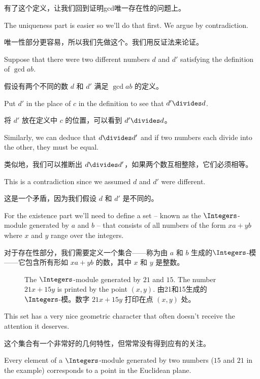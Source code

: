 有了这个定义，让我们回到证明gcd唯一存在性的问题上。

The uniqueness part is easier so we'll
do that first.  We argue by contradiction.

唯一性部分更容易，所以我们先做这个。我们用反证法来论证。

Suppose that there were
two different numbers $d$ and $d'$ satisfying the definition of $\gcd{a}{b}$.

假设有两个不同的数 $d$ 和 $d'$ 满足 $\gcd{a}{b}$ 的定义。

Put $d'$ in the place of $c$ in the definition to see that $d' \divides d$.

将 $d'$ 放在定义中 $c$ 的位置，可以看到 $d' \divides d$。

Similarly, we can deduce that $d \divides d'$ and if two numbers each divide
into the other, they must be equal.

类似地，我们可以推断出 $d \divides d'$，如果两个数互相整除，它们必须相等。

This is a contradiction since we
assumed $d$ and $d'$ were different.

这是一个矛盾，因为我们假设 $d$ 和 $d'$ 是不同的。

For the existence part we'll need to define a set -- known as the
$\Integers$-module generated by $a$ and $b$ -- that consists of all
numbers of the form $xa+yb$ where $x$ and $y$ range over the integers.

对于存在性部分，我们需要定义一个集合——称为由 $a$ 和 $b$ 生成的$\Integers$-模——它包含所有形如 $xa+yb$ 的数，其中 $x$ 和 $y$ 是整数。

\begin{figure}[!hbtp]
      \begin{center}
            
      \end{center}
      \caption[A $\Integers$-module.$\Integers$-模]{The $\Integers$-module generated by $21$ and %
            $15$.  The number $21x+15y$ is printed by the point $(x,y)$. 由21和15生成的$\Integers$-模。数字 $21x+15y$ 打印在点 $(x,y)$ 处。}
      \label{fig:zmodule}
\end{figure}

This set has a very nice geometric character that often doesn't receive the
attention it deserves.

这个集合有一个非常好的几何特性，但常常没有得到应有的关注。

Every element of a $\Integers$-module generated
by two numbers ($15$ and $21$ in the example)
corresponds to a point in the Euclidean plane.

